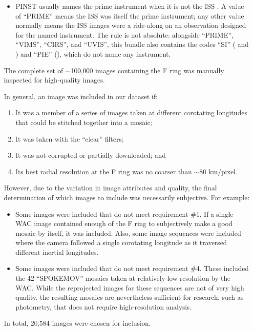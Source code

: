 \begin{itemize}
\begin{itemize}
\item SUBM*, TDIFS*, TMAP* – Thermal observations by the Composite Infrared Spectrometer (CIRS); ISS rider
\item UR* – Ultraviolet Imaging Spectrograph (UVIS) ring stellar occultation; ISS rider
\end{itemize}
\item PINST usually names the prime instrument when it is not the ISS . A value of “PRIME” means the ISS was itself the prime instrument; any other value normally means the ISS images were a ride-along on an observation designed for the named instrument. The rule is not absolute: alongside “PRIME”, “VIMS”, “CIRS”, and “UVIS”, this bundle also contains the codes “SI” ( and ) and “PIE” (), which do not name any instrument.
\end{itemize}
The complete set of $\sim$100,000 images containing the F ring was manually inspected for high-quality images.

In general, an image was included in our dataset if:

\begin{enumerate}
\item It was a member of a series of images taken at different corotating longitudes that could be stitched together into a mosaic;
\item It was taken with the “clear” filters;
\item It was not corrupted or partially downloaded; and
\item Its best radial resolution at the F ring was no coarser than $\sim$80 km/pixel.
\end{enumerate}
However, due to the variation in image attributes and quality, the final determination of which images to include was necessarily subjective. For example:

\begin{itemize}
\item Some images were included that do not meet requirement \#1. If a single WAC image contained enough of the F ring to subjectively make a good mosaic by itself, it was included. Also, some image sequences were included where the camera followed a single corotating longitude as it traversed different inertial longitudes.
\item Some images were included that do not meet requirement \#4. These included the 42 “SPOKEMOV” mosaics taken at relatively low resolution by the WAC. While the reprojected images for these sequences are not of very high quality, the resulting mosaics are nevertheless sufficient for research, such as photometry, that does not require high-resolution analysis.
\end{itemize}
In total, 20,584 images were chosen for inclusion.

